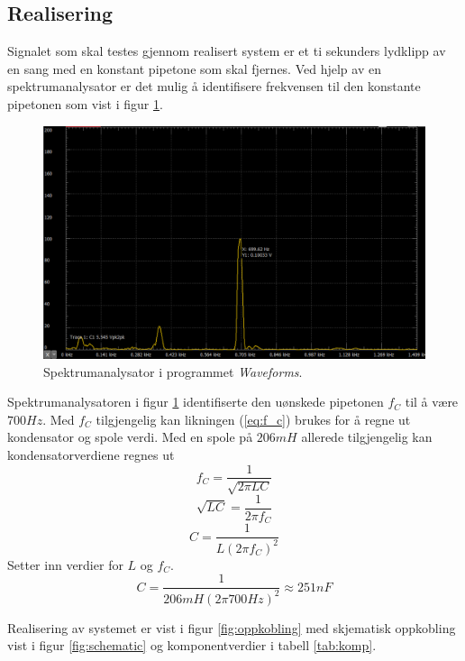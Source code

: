 \documentclass[a4paper,11pt,norsk]{article}
\begin{document}
\subsection{Realisering}
Signalet som skal testes gjennom realisert system er et ti sekunders lydklipp av en sang med en konstant pipetone som skal fjernes. 
Ved hjelp av en spektrumanalysator er det mulig å identifisere frekvensen til den konstante pipetonen som vist i figur \ref{fig:5}.

\begin{figure}[H]
  \centering
  \includegraphics[scale=0.7]{D1/Images/Spectrum Analyzer 700Hz.png}
  \caption{Spektrumanalysator i programmet \emph{Waveforms}.}
  \label{fig:5}
\end{figure}

Spektrumanalysatoren i figur \ref{fig:5} identifiserte den uønskede pipetonen $f_C$ til å være $700Hz$. Med $f_C$ tilgjengelig kan likningen (\ref{eq:f_c}) brukes for å regne ut kondensator og spole verdi. 
Med en spole på $206mH$ allerede tilgjengelig kan kondensatorverdiene regnes ut
\begin{equation}
    f_C = \frac{1}{\sqrt{2\pi LC}}
\end{equation}
\begin{equation}
    \sqrt{LC}= \frac{1}{2\pi f_C}
\end{equation}
\begin{equation}
    C = \frac{1}{L(2\pi f_C)^2}
\end{equation}
Setter inn verdier for $L$ og $f_C$.
\begin{equation}
    C = \frac{1}{206mH(2\pi 700Hz)^2} \approx 251nF
\end{equation}

Realisering av systemet er vist i figur \ref{fig:oppkobling} med skjematisk oppkobling vist i figur \ref{fig:schematic} og komponentverdier i tabell \ref{tab:komp}.
\end{document}
